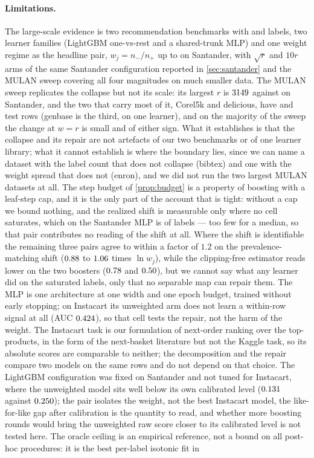 \documentclass[sigconf,nonacm]{acmart}
\begin{document}
\paragraph{Limitations.} The large-scale evidence is two recommendation benchmarks with \nnLabels{} and \nInLabels{} labels, two learner families (LightGBM one-vs-rest and a shared-trunk MLP) and one weight regime as the headline pair, $w_j=n_-/n_+$ up to \nwMax{} on Santander, with $\sqrt{r}$ and $10r$ arms of the same Santander configuration reported in \cref{sec:santander} and the MULAN sweep covering all four magnitudes on much smaller data. The MULAN sweep replicates the collapse but not its scale: its largest $r$ is $3149$ against \nwMax{} on Santander, and the two that carry most of it, Corel5k and delicious, have \ncorelNtestDose{} and \ndelNtestDose{} test rows (genbase is the third, on one learner), and on the majority of the sweep the change at $w{=}r$ is small and of either sign. What it establishes is that the collapse and its repair are not artefacts of our two benchmarks or of one learner library; what it cannot establish is where the boundary lies, since we can name a dataset with the label count that does not collapse (bibtex) and one with the weight spread that does not (enron), and we did not run the two largest MULAN datasets at all. The step budget of \cref{prop:budget} is a property of boosting with a leaf-step cap, and it is the only part of the account that is tight: without a cap we bound nothing, and the realized shift is measurable only where no cell saturates, which on the Santander MLP is \nMSnIdentShift{} of \nnLabels{} labels --- too few for a median, so that pair contributes no reading of the shift at all. Where the shift is identifiable the remaining three pairs agree to within a factor of $1.2$ on the prevalence-matching shift ($0.88$ to $1.06$ times $\ln w_j$), while the clipping-free estimator reads lower on the two boosters ($0.78$ and $0.50$), but we cannot say what any learner did on the saturated labels, only that no separable map can repair them. The MLP is one architecture at one width and one epoch budget, trained without early stopping; on Instacart its unweighted arm does not learn a within-row signal at all (AUC $0.424$), so that cell tests the repair, not the harm of the weight. The Instacart task is our formulation of next-order ranking over the top-\nInLabels{} products, in the form of the next-basket literature but not the Kaggle task, so its absolute scores are comparable to neither; the decomposition and the repair compare two models on the same rows and do not depend on that choice. The LightGBM configuration was fixed on Santander and not tuned for Instacart, where the unweighted model sits well below its own calibrated level ($0.131$ against $0.250$); the pair isolates the weight, not the best Instacart model, the like-for-like gap after calibration is the quantity to read, and whether more boosting rounds would bring the unweighted raw score closer to its calibrated level is not tested here. The oracle ceiling is an empirical reference, not a bound on all post-hoc procedures: it is the best per-label isotonic fit in 
\end{document}
